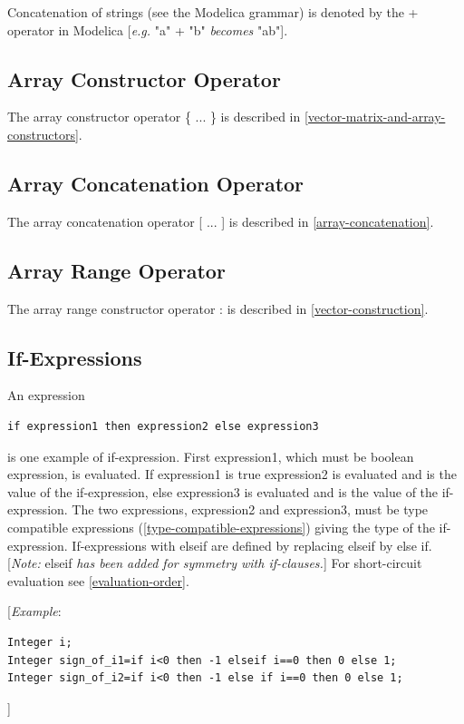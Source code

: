 \documentclass[10pt,a4paper]{report}
\def\doublelabel#1{\label{#1}\hypertarget{#1}{}}
\begin{document}
Concatenation of strings (see the Modelica grammar) is denoted by the +
operator in Modelica {[}\emph{e.g.} "a" + "b" \emph{becomes} "ab"{]}.

\subsection{Array Constructor Operator}\doublelabel{array-constructor-operator}

The array constructor operator \{ ... \} is described in \ref{vector-matrix-and-array-constructors}.

\subsection{Array Concatenation Operator}\doublelabel{array-concatenation-operator}

The array concatenation operator {[} ... {]} is described in \ref{array-concatenation}.

\subsection{Array Range Operator}\doublelabel{array-range-operator}

The array range constructor operator : is described in \ref{vector-construction}.

\subsection{If-Expressions}\doublelabel{if-expressions}

An expression
\begin{lstlisting}[language=modelica]
if expression1 then expression2 else expression3
\end{lstlisting}

is one example of if-expression. First expression1, which must be
boolean expression, is evaluated. If expression1 is true expression2 is
evaluated and is the value of the if-expression, else expression3 is
evaluated and is the value of the if-expression. The two expressions,
expression2 and expression3, must be type compatible expressions
(\ref{type-compatible-expressions}) giving the type of the if-expression. If-expressions with
elseif are defined by replacing elseif by else if. {[}\emph{Note:}
elseif \emph{has been added for symmetry with if-clauses.}{]} For
short-circuit evaluation see \ref{evaluation-order}.

{[}\emph{Example}:
\begin{lstlisting}[language=modelica]
Integer i;
Integer sign_of_i1=if i<0 then -1 elseif i==0 then 0 else 1;
Integer sign_of_i2=if i<0 then -1 else if i==0 then 0 else 1;
\end{lstlisting}
{]}
\end{document}
